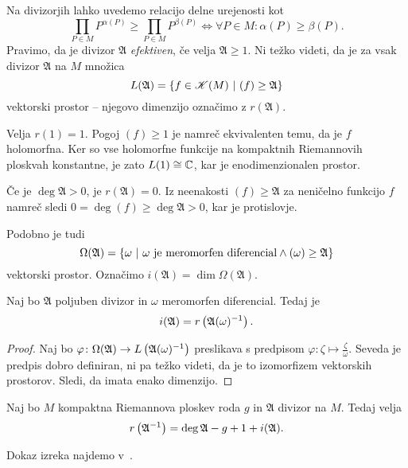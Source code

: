 Na divizorjih lahko uvedemo relacijo delne urejenosti kot
\[
\prod_{P \in M} P^{\alpha(P)} \geq \prod_{P \in M} P^{\beta(P)}
\iff
\forall P \in M \colon \alpha(P) \geq \beta(P).
\]
Pravimo, da je divizor $\mathfrak{A}$ \emph{efektiven}, če velja
$\mathfrak{A} \geq 1$. Ni težko videti, da je za vsak divizor
$\mathfrak{A}$ na $M$ množica
\[
L(\mathfrak{A}) =
\left\{f \in \mathscr{K}(M)~\middle\vert~(f) \geq \mathfrak{A}\right\}
\]
vektorski prostor -- njegovo dimenzijo označimo z
$r(\mathfrak{A})$.

\begin{zgled}
Velja $r(1) = 1$. Pogoj $(f) \geq 1$ je namreč ekvivalenten temu,
da je $f$ holomorfna. Ker so vse holomorfne funkcije na kompaktnih
Riemannovih ploskvah konstantne, je zato $L(1) \cong \mathbb{C}$, kar je
enodimenzionalen prostor.
\end{zgled}

\begin{zgled}
Če je $\deg \mathfrak{A} > 0$, je $r(\mathfrak{A}) = 0$. Iz
neenakosti $(f) \geq \mathfrak{A}$ za neničelno funkcijo $f$
namreč sledi $0 = \deg (f) \geq \deg \mathfrak{A} > 0$, kar je
protislovje.
\end{zgled}

Podobno je tudi
\[
\Omega(\mathfrak{A}) =
\left\{\omega~\middle\vert~\text{$\omega$ je meromorfen diferencial} \land
(\omega) \geq \mathfrak{A}\right\}
\]
vektorski prostor. Označimo
$i(\mathfrak{A}) = \dim \Omega(\mathfrak{A})$.

\begin{trditev}\label{td:mero_dif}
Naj bo $\mathfrak{A}$ poljuben divizor in $\omega$ meromorfen
diferencial. Tedaj je
\[
i(\mathfrak{A}) = r \left(\mathfrak{A} (\omega)^{-1}\right).
\]
\end{trditev}

\begin{proof}
Naj bo $\varphi \colon
\Omega(\mathfrak{A}) \to L \left(\mathfrak{A} (\omega)^{-1}\right)$
preslikava s predpisom
$\varphi \colon \zeta \mapsto \frac{\zeta}{\omega}$. Seveda je
predpis dobro definiran, ni pa težko videti, da je to izomorfizem
vektorskih prostorov. Sledi, da imata enako dimenzijo.
\end{proof}

\begin{izrek}
Naj bo $M$ kompaktna Riemannova ploskev roda $g$ in $\mathfrak{A}$
divizor na $M$. Tedaj velja
\[
r \left(\mathfrak{A}^{-1}\right) =
\deg \mathfrak{A} - g + 1 + i(\mathfrak{A}).
\]
\end{izrek}

Dokaz izreka najdemo v~\cite[theorem~III.4.11]{Farkas_Kra_1980}.

